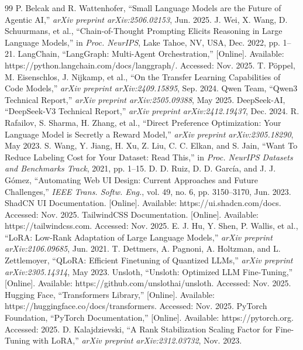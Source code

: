 \documentclass[pdflatex,sn-mathphys-num]{sn-jnl}
\theoremstyle{thmstyleone}
\theoremstyle{thmstyletwo}
\theoremstyle{thmstylethree}
\begin{document}
\begin{thebibliography}{99}
 P. Belcak and R. Wattenhofer, ``Small Language Models are the Future of Agentic AI,'' \textit{arXiv preprint arXiv:2506.02153}, Jun. 2025.
 J. Wei, X. Wang, D. Schuurmans, et al., ``Chain-of-Thought Prompting Elicits Reasoning in Large Language Models,'' in \textit{Proc. NeurIPS}, Lake Tahoe, NV, USA, Dec. 2022, pp. 1–21.
 LangChain, ``LangGraph: Multi-Agent Orchestration,'' [Online]. Available: https://python.langchain.com/docs/langgraph/. Accessed: Nov. 2025.
 T. Pöppel, M. Eisenschlos, J. Nijkamp, et al., ``On the Transfer Learning Capabilities of Code Models,'' \textit{arXiv preprint arXiv:2409.15895}, Sep. 2024.
 Qwen Team, ``Qwen3 Technical Report,'' \textit{arXiv preprint arXiv:2505.09388}, May 2025.
 DeepSeek-AI, ``DeepSeek-V3 Technical Report,'' \textit{arXiv preprint arXiv:2412.19437}, Dec. 2024.
 R. Rafailov, S. Sharma, H. Zhang, et al., ``Direct Preference Optimization: Your Language Model is Secretly a Reward Model,'' \textit{arXiv preprint arXiv:2305.18290}, May 2023.
 S. Wang, Y. Jiang, H. Xu, Z. Liu, C. C. Elkan, and S. Jain, ``Want To Reduce Labeling Cost for Your Dataset: Read This,'' in \textit{Proc. NeurIPS Datasets and Benchmarks Track}, 2021, pp. 1–15.
 D. D. Ruiz, D. D. García, and J. J. Gómez, ``Automating Web UI Design: Current Approaches and Future Challenges,'' \textit{IEEE Trans. Softw. Eng.}, vol. 49, no. 6, pp. 3150–3170, Jun. 2023.
 ShadCN UI Documentation. [Online]. Available: https://ui.shadcn.com/docs. Accessed: Nov. 2025.
 TailwindCSS Documentation. [Online]. Available: https://tailwindcss.com. Accessed: Nov. 2025.
 E. J. Hu, Y. Shen, P. Wallis, et al., ``LoRA: Low-Rank Adaptation of Large Language Models,'' \textit{arXiv preprint arXiv:2106.09685}, Jun. 2021.
 T. Dettmers, A. Pagnoni, A. Holtzman, and L. Zettlemoyer, ``QLoRA: Efficient Finetuning of Quantized LLMs,'' \textit{arXiv preprint arXiv:2305.14314}, May 2023.
 Unsloth, ``Unsloth: Optimized LLM Fine-Tuning,'' [Online]. Available: https://github.com/unslothai/unsloth. Accessed: Nov. 2025.
 Hugging Face, ``Transformers Library,'' [Online]. Available: https://huggingface.co/docs/transformers. Accessed: Nov. 2025.
 PyTorch Foundation, ``PyTorch Documentation,'' [Online]. Available: https://pytorch.org. Accessed: 2025.
 D. Kalajdzievski, ``A Rank Stabilization Scaling Factor for Fine-Tuning with LoRA,'' \textit{arXiv preprint arXiv:2312.03732}, Nov. 2023.
\end{thebibliography}
\end{document}
